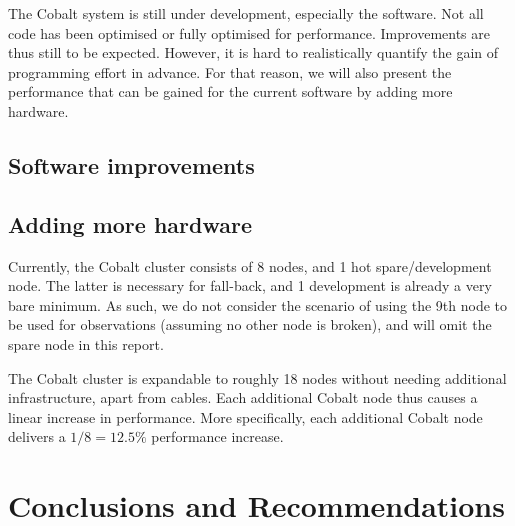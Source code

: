 \documentclass{report}
\begin{document}
The Cobalt system is still under development, especially the software. Not all code has been optimised or fully optimised for performance. Improvements are thus still to be expected. However, it is hard to realistically quantify the gain of programming effort in advance. For that reason, we will also present the performance that can be gained for the current software by adding more hardware.

\subsection{Software improvements}
\subsection{Adding more hardware}

Currently, the Cobalt cluster consists of 8 nodes, and 1 hot spare/development node. The latter is necessary for fall-back, and 1 development is already a very bare minimum. As such, we do not consider the scenario of using the 9th node to be used for observations (assuming no other node is broken), and will omit the spare node in this report.

The Cobalt cluster is expandable to roughly 18 nodes without needing additional infrastructure, apart from cables. Each additional Cobalt node thus causes a linear increase in performance. More specifically, each additional Cobalt node delivers a $1/8=12.5\%$ performance increase.

\section{Conclusions and Recommendations}
\end{document}
